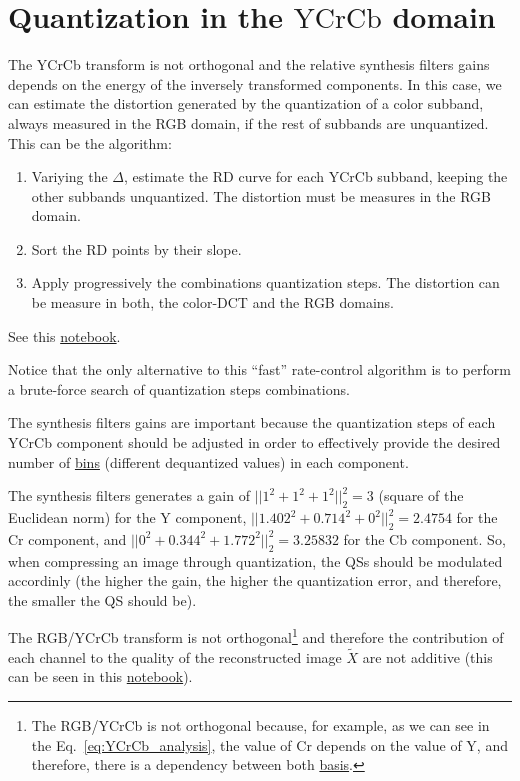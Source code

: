 \section{Quantization in the $\text{YCrCb}$ domain}
The YCrCb transform is not orthogonal and the relative synthesis
filters gains depends on the energy of the inversely transformed
components. In this case, we can estimate the distortion generated by
the quantization of a color subband, always measured in the RGB
domain, if the rest of subbands are unquantized. This can be the
algorithm:
\begin{enumerate}
\item Variying the $\Delta$, estimate the RD curve for each YCrCb
  subband, keeping the other subbands unquantized. The distortion must
  be measures in the RGB domain.
\item Sort the RD points by their slope.
\item Apply progressively the combinations quantization steps. The
  distortion can be measure in both, the color-DCT and the RGB
  domains.
\end{enumerate}
See this \href{https://github.com/Sistemas-Multimedia/Sistemas-Multimedia.github.io/blob/master/study_guide/06-color_transform/YCrCb_compression.ipynb}{notebook}.

Notice that the only alternative to this ``fast'' rate-control
algorithm is to perform a brute-force search of quantization steps
combinations.

The synthesis filters gains are important because the quantization
steps of each YCrCb component should be adjusted in order to
effectively provide the desired number of
\href{http://www.winlab.rutgers.edu/~crose/322_html/quantization.pdf}{bins}
(different dequantized values) in each component.

The synthesis filters generates a gain of $||1^2 + 1^2 + 1^2||_2^2=3$
(square of the Euclidean norm) for the $\text{Y}$ component,
$||1.402^2 + 0.714^2 + 0^2||_2^2=2.4754$ for the $\text{Cr}$
component, and $||0^2 + 0.344^2+ 1.772^2||_2^2=3.25832$ for the
$\text{Cb}$ component. So, when compressing an image through
quantization, the QSs should be modulated accordinly (the higher the
gain, the higher the quantization error, and therefore, the smaller
the QS should be).

The RGB/YCrCb
transform is not orthogonal\footnote{The RGB/YCrCb is not orthogonal
because, for example, as we can see in the
Eq.~\ref{eq:YCrCb_analysis}, the value of Cr depends on the value of
Y, and therefore, there is a dependency between both
\href{https://en.wikipedia.org/wiki/Basis_(linear_algebra)}{basis}.}
and therefore the contribution of each channel to the quality of the
reconstructed image $\tilde{X}$ are not additive (this can be seen in
this
\href{https://github.com/Sistemas-Multimedia/Sistemas-Multimedia.github.io/blob/master/study_guide/06-color_transform/performance.ipynb}{notebook}).

